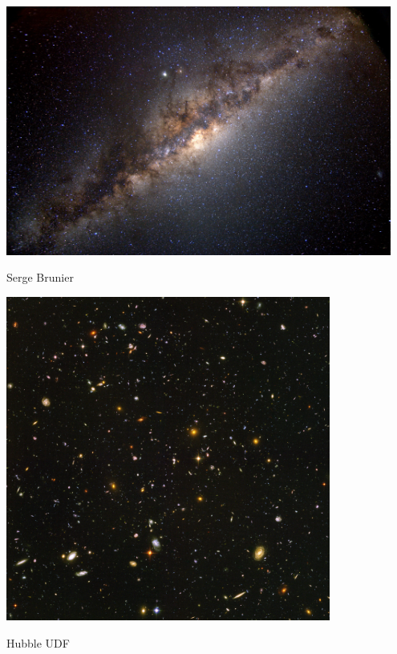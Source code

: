 \documentclass{beamer}
\begin{document}
\frame
{
    \begin{center}
        \includegraphics[width=0.95\textwidth]{16500feetmilkywaykc2_brunier.jpg}
    \end{center}
    {\normalsize Serge Brunier}
}


\frame
{
    \begin{center}
        \includegraphics[width=0.8\textwidth]{UDF_half.jpg}
    \end{center}
    {\normalsize Hubble UDF}
}
\end{document}
